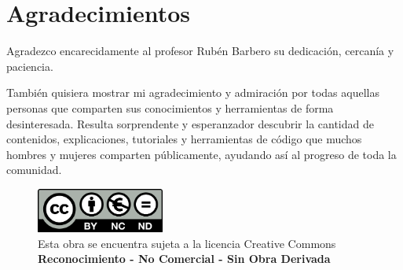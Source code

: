 \documentclass[12pt]{report} %
\begin{document}
				



			
			



\chapter*{Agradecimientos}

Agradezco encarecidamente al profesor Rubén Barbero su dedicación, cercanía y paciencia. 

También quisiera mostrar mi agradecimiento y admiración por todas aquellas personas que comparten sus conocimientos y herramientas de forma desinteresada. Resulta sorprendente y esperanzador descubrir la cantidad de contenidos, explicaciones, tutoriales y herramientas de código que muchos hombres y mujeres     comparten públicamente, ayudando así al progreso de toda la comunidad.

\begin{figure}[b!]
\centering
\captionsetup{justification=centering}
\includegraphics[width=4.2cm]{images/creativecommons.png}
\caption*{Esta obra se encuentra sujeta a la licencia Creative Commons \\
 \textbf{Reconocimiento - No Comercial - Sin Obra Derivada}}
\end{figure}

\setcounter{page}{4}
		
	\vfill
	
	\newpage %
	\thispagestyle{empty}
	\mbox{}
	


\tableofcontents
\thispagestyle{fancy}

\newpage %
\thispagestyle{empty}
\mbox{}

\listoffigures
\thispagestyle{fancy}

\newpage %
\thispagestyle{empty}
\mbox{}

\listoftables
\thispagestyle{fancy}

\newpage %
\thispagestyle{empty}
\mbox{}
\end{document}
